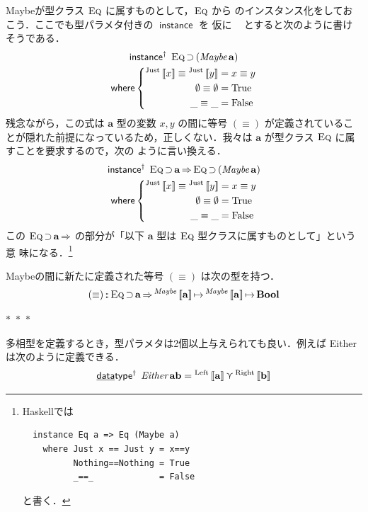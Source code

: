 \documentclass[a5paper,twoside,fleqn]{jsbook}
\def\[{\left[\!\left[}
\def\]{\right]\!\right]}
\newcommand{\separator}{\begin{center}$*$~$*$~$*$\end{center}}
\newcommand{\programminglanguage}[1]{\textsf{#1}}
\newcommand{\haskell}{\programminglanguage{Haskell}}
\newcommand{\mKeyword}[1]{\mathsf{#1}} %
\newcommand{\mKeywordUnderline}[1]{\text{\underline{\textsf{#1}}}} %
\newcommand{\mDataTypeKeyword}{\mKeywordUnderline{data}\mKeyword{type}}
\newcommand{\mInstanceKeyword}{\mKeyword{instance}}
\newcommand{\mWhereKeyword}{\mKeyword{where}}
\DeclareMathOperator{\mDataTypeParametric}{\mDataTypeKeyword^\dagger}
\DeclareMathOperator{\mInstance}{\mInstanceKeyword}
\DeclareMathOperator{\mInstanceParametric}{\mInstanceKeyword^{\dagger}}
\DeclareMathOperator{\mSuperClass}{\Rightarrow}
\DeclareMathOperator{\mSuperSet}{\supset}
\DeclareMathOperator{\mWhere}{\mWhereKeyword}
\newcommand{\mSpecialConstant}[1]{\textrm{#1}} %
\newcommand{\mFalse}{\mSpecialConstant{False}}
\newcommand{\mNothing}{\emptyset}
\newcommand{\mTrue}{\mSpecialConstant{True}}
\newcommand{\mAnyParam}{\_}
\DeclareMathOperator{\mIn}{{:\!:}}
\DeclareMathOperator{\mMapsTo}{\mapsto}
\DeclareMathOperator{\mValueOr}{\curlyvee}
\newcommand{\mSpecialSub}[1]{\text{#1}}
\newcommand{\mLeft}{\mSpecialSub{Left}}
\newcommand{\mRight}{\mSpecialSub{Right}}
\newcommand{\mType}[1]{\mathbf{#1}}
\newcommand{\mBoolType}{\mType{Bool}}
\newcommand{\mGenericTypeAssemble}[2]{{}^{\mTypeConstructor{#1}}\[\mType{#2}\]}
\newcommand{\mMaybeType}[1]{\mGenericTypeAssemble{Maybe}{#1}}
\newcommand{\mTypeConstructor}[1]{\textit{#1}}
\DeclareMathOperator{\mEitherTypeConstructor}{\mTypeConstructor{Either}}
\DeclareMathOperator{\mMaybeTypeConstructor}{\mTypeConstructor{Maybe}}
\newcommand{\mGenericValueConstructor}[1]{\mathrm{#1}}
\newcommand{\mGenericWith}[2]{{}^\mGenericValueConstructor{#1}\[#2\]}
\newcommand{\mLeftWith}[1]{\mGenericWith{\mLeft}{#1}}
\newcommand{\mRightWith}[1]{\mGenericWith{\mRight}{#1}}
\newcommand{\mJustWith}[1]{\mGenericWith{Just}{#1}}
\newcommand{\mGenericTypeClass}[1]{\textsc{#1}} %
\newcommand{\mEqTypeClass}{\mGenericTypeClass{Eq}}
\newcommand{\mProj}[2]{#1\mMapsTo#2}
\begin{document}
Maybeが型クラス $\mEqTypeClass$ に属すものとして，$\mEqTypeClass$ から
のインスタンス化をしておこう．ここでも型パラメタ付きの $\mInstance$ を
仮に $\mInstanceParametric$ とすると次のように書けそうである．
\begin{multline}
\mInstanceParametric\;
\mEqTypeClass\mSuperSet{}(\mMaybeTypeConstructor\mType{a})\\
\mWhere
\left\{
\begin{aligned}
\mJustWith{x}\equiv\mJustWith{y}&=x\equiv y\\
\mNothing\equiv\mNothing&=\mTrue\\
\mAnyParam\equiv\mAnyParam&=\mFalse
\end{aligned}
\right.
\end{multline}
残念ながら，この式は $\mType{a}$ 型の変数 $x,y$ の間に等号 $(\equiv)$
が定義されていることが隠れた前提になっているため，正しくない．我々は
$\mType{a}$ が型クラス $\mEqTypeClass$ に属すことを要求するので，次の
ように言い換える．
\begin{multline}
\mInstanceParametric\;
\mEqTypeClass\mSuperSet\mType{a}
\mSuperClass
\mEqTypeClass\mSuperSet{}(\mMaybeTypeConstructor\mType{a})\\
\mWhere
\left\{
\begin{aligned}
\mJustWith{x}\equiv\mJustWith{y}&=x\equiv y\\
\mNothing\equiv\mNothing&=\mTrue\\
\mAnyParam\equiv\mAnyParam&=\mFalse
\end{aligned}
\right.
\end{multline}
この $\mEqTypeClass\mSuperSet\mType{a}\mSuperClass$ の部分が「以下
$\mType{a}$ 型は $\mEqTypeClass$ 型クラスに属すものとして」という意
味になる．\footnote{\haskell では
\begin{verbatim}
  instance Eq a => Eq (Maybe a)
    where Just x == Just y = x==y
          Nothing==Nothing = True
          _==_             = False
\end{verbatim}
と書く．
}

Maybeの間に新たに定義された等号 $(\equiv)$ は次の型を持つ．
\begin{equation}
(\equiv)
\mIn{}\mEqTypeClass\mSuperSet\mType{a}
\mSuperClass\mProj{\mMaybeType{a}}{\mProj{\mMaybeType{a}}{\mBoolType}}
\end{equation}

\separator

多相型を定義するとき，型パラメタは2個以上与えられても良い．例えば
Eitherは次のように定義できる．
\begin{equation}
\mDataTypeParametric\;\mEitherTypeConstructor\mType{a}\mType{b}
=\mLeftWith{\mType{a}}
\mValueOr
\mRightWith{\mType{b}}
\end{equation}
\end{document}
